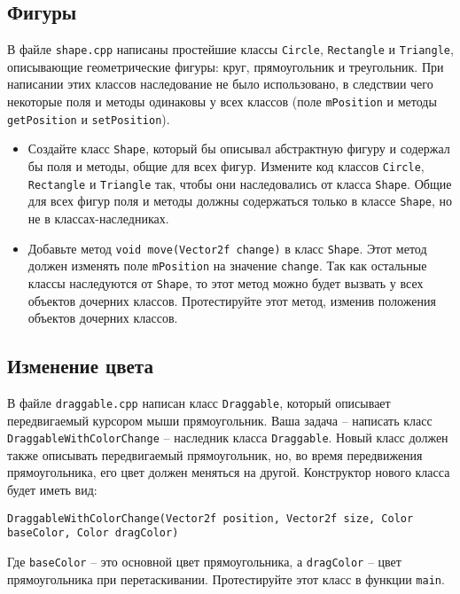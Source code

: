 \documentclass{article}
\begin{document}
\subsection{Фигуры}
В файле \texttt{shape.cpp} написаны простейшие классы \texttt{Circle}, \texttt{Rectangle} и \texttt{Triangle}, описывающие геометрические фигуры: круг, прямоугольник и треугольник. При написании этих классов наследование не было использовано, в следствии чего некоторые поля и методы одинаковы у всех классов (поле \texttt{mPosition} и методы \texttt{getPosition} и \texttt{setPosition}).

\begin{itemize}
\item Создайте класс \texttt{Shape}, который бы описывал абстрактную фигуру и содержал бы поля и методы, общие для всех фигур. Измените код классов \texttt{Circle}, \texttt{Rectangle} и \texttt{Triangle} так, чтобы они наследовались от класса \texttt{Shape}. Общие для всех фигур поля и методы должны содержаться только в классе \texttt{Shape}, но не в классах-наследниках.

\item Добавьте метод \texttt{void move(Vector2f change)} в класс \texttt{Shape}. Этот метод должен изменять поле \texttt{mPosition} на значение \texttt{change}. Так как остальные классы наследуются от \texttt{Shape}, то этот метод можно будет вызвать у всех объектов дочерних классов. Протестируйте этот метод, изменив положения объектов дочерних классов.
\end{itemize}




\subsection{Изменение цвета}
В файле \texttt{draggable.cpp} написан класс \texttt{Draggable}, который описывает передвигаемый курсором мыши прямоугольник. Ваша задача -- написать класс \texttt{DraggableWithColorChange} -- наследник класса \texttt{Draggable}. Новый класс должен также описывать передвигаемый прямоугольник, но, во время передвижения прямоугольника, его цвет должен меняться на другой. Конструктор нового класса будет иметь вид:
\begin{lstlisting}
DraggableWithColorChange(Vector2f position, Vector2f size, Color baseColor, Color dragColor) 
\end{lstlisting}
Где \texttt{baseColor} -- это основной цвет прямоугольника, а \texttt{dragColor} -- цвет прямоугольника при перетаскивании.
Протестируйте этот класс в функции \texttt{main}.
\end{document}
